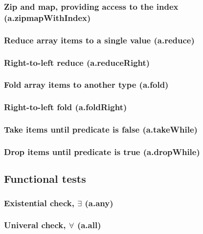 \documentclass{article}
\theoremstyle{definition}
\begin{document}
\subsubsection{Zip and map, providing access to the index (a.zipmapWithIndex)}

\subsubsection{Reduce array items to a single value (a.reduce)}

\subsubsection{Right-to-left reduce (a.reduceRight)}

\subsubsection{Fold array items to another type (a.fold)}

\subsubsection{Right-to-left fold (a.foldRight)}

\subsubsection{Take items until predicate is false (a.takeWhile)}

\subsubsection{Drop items until predicate is true (a.dropWhile)}

\subsection{Functional tests}

\subsubsection{Existential check, $\exists$ (a.any)}

\subsubsection{Univeral check, $\forall$ (a.all)}
\end{document}
